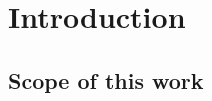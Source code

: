 \chapter{Introduction}
\label{ch:Intro}
\thispagestyle{empty}



\lipsum


\section{Scope of this work}
\label{sec:Intro-Scope}

\lipsum






